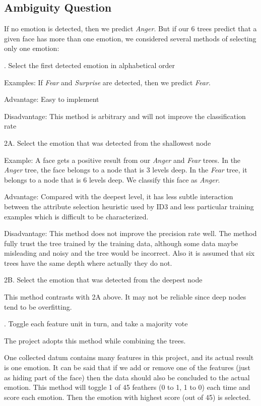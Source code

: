 \documentclass[12pt, a4paper]{article}
\begin{document}
\subsection*{Ambiguity Question}
If no emotion is detected, then we predict \textit{Anger}. But if our 6 trees predict that a given face has more than one emotion, we considered several methods of selecting only one emotion:\par
{}. Select the first detected emotion in alphabetical order\par
\bigskip
Examples: If \textit{Fear} and \textit{Surprise} are detected, then we predict \textit{Fear}.\par
Advantage: Easy to implement\par
Disadvantage: This method is arbitrary and will not improve the classification rate\par
\bigskip
2A. Select the emotion that was detected from the shallowest node\par
\bigskip
Example: A face gets a positive result from our \textit{Anger} and \textit{Fear} trees. In the \textit{Anger} tree, the face belongs to a node that is 3 levels deep. In the \textit{Fear} tree, it belongs to a node that is 6 levels deep. We classify this face as \textit{Anger}.\par
\bigskip
Advantage: Compared with the deepest level, it has less subtle interaction between the attribute selection heuristic used by ID3 and less particular training examples which is difficult to be characterized.\par
\bigskip
Disadvantage: This method does not improve the precision rate well. The method fully trust the tree trained by the training data, although some data maybe misleading and noisy and the tree would be incorrect. Also it is assumed that six trees have the same depth where actually they do not.\par
\bigskip
2B. Select the emotion that was detected from the deepest node\par
\bigskip
This method contrasts with 2A above. It may not be reliable since deep nodes tend to be overfitting.\par
{}. Toggle each feature unit in turn, and take a majority vote\par
\bigskip
The project adopts this method while combining the trees.\par
One collected datum contains many features in this project, and its actual result is one emotion. It can be said that if we add or remove one of the features (just as hiding part of the face) then the data should also be concluded to the actual emotion. This method will toggle 1 of 45 feathers (0 to 1, 1 to 0) each time and score each emotion. Then the emotion with highest score (out of 45) is selected.\par
\end{document}

